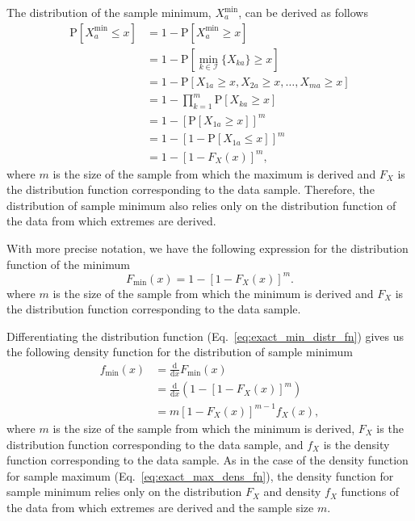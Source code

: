 \documentclass[aoas]{imsart}
\begin{document}
The distribution of the sample minimum, $X^\text{min}_a$, can be derived as follows
%
\begin{equation}\label{eq:exact_min}
\begin{aligned}
\text{P}[X^\text{min}_a \leq x] &= 1 - \text{P}[X^\text{min}_a \geq x] \\
&= 1 - \text{P}\left[\min_{k \in \mathcal{I}}\{X_{ka}\} \geq x\right] \\
&= 1 - \text{P}[X_{1a} \geq x, X_{2a} \geq x, \dots, X_{ma} \geq x] \\
&= 1 - \prod_{k=1}^{m}\text{P}[X_{ka} \geq x] \\
&= 1 - \left[\text{P}[X_{1a} \geq x]\right]^m \\
&= 1 - \left[1 - \text{P}[X_{1a} \leq x]\right]^m \\
&= 1 - \left[1 - F_X(x)\right]^m,
\end{aligned}
\end{equation}
%
where $m$ is the size of the sample from which the maximum is derived and $F_X$ is the distribution function corresponding to the data sample. Therefore, the distribution of sample minimum also relies only on the distribution function of the data from which extremes are derived.

With more precise notation, we have the following expression for the distribution function of the minimum
%
\begin{equation}\label{eq:exact_min_distr_fn}
F_\text{min}(x) = 1 - [1 - F_X(x)]^m.
\end{equation}
%
where $m$ is the size of the sample from which the minimum is derived and $F_X$ is the distribution function corresponding to the data sample.

Differentiating the distribution function (Eq.~\ref{eq:exact_min_distr_fn}) gives us the following density function for the distribution of sample minimum
%
\begin{equation}\label{eq:exact_min_dens_fn}
\begin{aligned}
f_\text{min}(x) &= \frac{\text{d}}{\text{d}x} F_\text{min}(x) \\
&= \frac{\text{d}}{\text{d}x} \left(1 - [1 - F_X(x)]^m\right) \\
&= m\left[1 - F_X(x)\right]^{m-1}f_X(x),
\end{aligned}
\end{equation}
%
where $m$ is the size of the sample from which the minimum is derived, $F_X$ is the distribution function corresponding to the data sample, and $f_X$ is the density function corresponding to the data sample. As in the case of the density function for sample maximum (Eq.~\ref{eq:exact_max_dens_fn}), the density function for sample minimum relies only on the distribution $F_X$ and density $f_X$ functions of the data from which extremes are derived and the sample size $m$.
\end{document}
